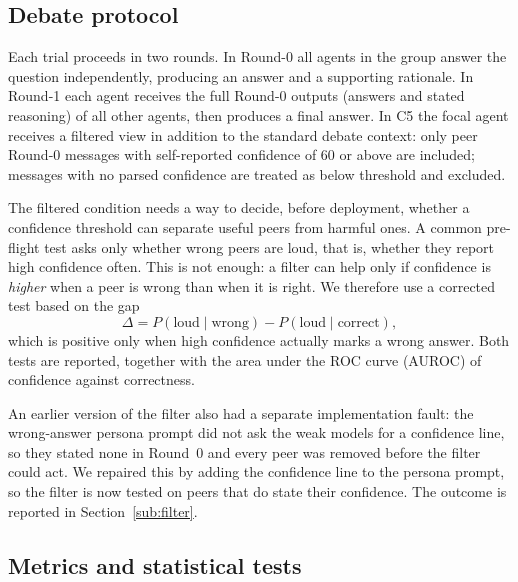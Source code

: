\documentclass[11pt]{article}
\begin{document}
\subsection{Debate protocol}
\label{sub:protocol}

Each trial proceeds in two rounds.
In Round-0 all agents in the group answer the question independently,
producing an answer and a supporting rationale.
In Round-1 each agent receives the full Round-0 outputs (answers and
stated reasoning) of all other agents, then produces a final answer.
In C5 the focal agent receives a filtered view in addition to the
standard debate context: only peer Round-0 messages with self-reported
confidence of 60 or above are included; messages with no parsed
confidence are treated as below threshold and excluded.

The filtered condition needs a way to decide, before deployment, whether a
confidence threshold can separate useful peers from harmful ones.
A common pre-flight test asks only whether wrong peers are loud, that is,
whether they report high confidence often.
This is not enough: a filter can help only if confidence is \emph{higher}
when a peer is wrong than when it is right.
We therefore use a corrected test based on the gap
\[
\Delta = P(\text{loud}\mid\text{wrong}) - P(\text{loud}\mid\text{correct}),
\]
which is positive only when high confidence actually marks a wrong answer.
Both tests are reported, together with the area under the ROC curve
(AUROC) of confidence against correctness.

An earlier version of the filter also had a separate implementation fault:
the wrong-answer persona prompt did not ask the weak models for a
confidence line, so they stated none in Round~0 and every peer was removed
before the filter could act.
We repaired this by adding the confidence line to the persona prompt, so
the filter is now tested on peers that do state their confidence.
The outcome is reported in Section~\ref{sub:filter}.

\subsection{Metrics and statistical tests}
\label{sub:stats}
\end{document}

